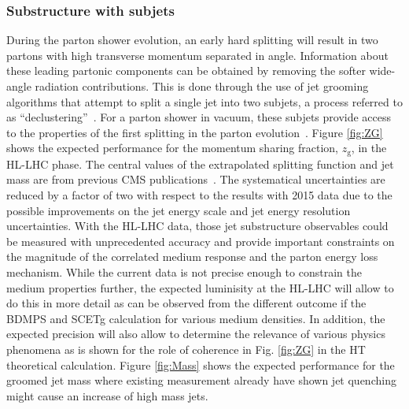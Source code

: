 \subsubsection{Substructure with subjets}
During the parton shower evolution, an early hard splitting will result in two partons with high transverse momentum separated in angle. Information about these leading partonic components can be obtained by removing the softer wide-angle radiation contributions. This is done through the use of jet grooming algorithms that attempt to split a single jet into two subjets, a process referred to as ``declustering''~\cite{Ellis:2009me,Butterworth:2008iy,Krohn:2009th,Dasgupta:2013ihk,Larkoski:2014wba}. For a parton shower in vacuum, these subjets provide access to the properties of the first splitting in the parton evolution~\cite{Altarelli:1977zs,Larkoski:2015lea}. Figure \ref{fig:ZG} shows the expected performance for the momentum sharing fraction, $z_{\mathrm{g}}$, in the HL-LHC phase. The central values of the extrapolated splitting function and jet mass are from previous CMS publications~\cite{Sirunyan:2017bsd,Sirunyan:2018gct}. The systematical uncertainties are reduced by a factor of two with respect to the results with 2015 data due to the possible improvements on the jet energy scale and jet energy resolution uncertainties. With the HL-LHC data, those jet substructure observables could be measured with unprecedented accuracy and provide important constraints on the magnitude of the correlated medium response and the parton energy loss mechanism. While the current data is not precise enough to constrain the medium properties further, the expected luminisity at the HL-LHC will allow to do this in more detail as can be observed from the different outcome if the BDMPS and SCETg calculation for various medium densities. In addition, the expected precision will also allow to determine the relevance of various physics phenomena as is shown for the role of coherence in Fig. \ref{fig:ZG} in the HT theoretical calculation. Figure \ref{fig:Mass} shows the expected performance for the groomed jet mass where existing measurement already have shown jet quenching might cause an increase of high mass jets.
